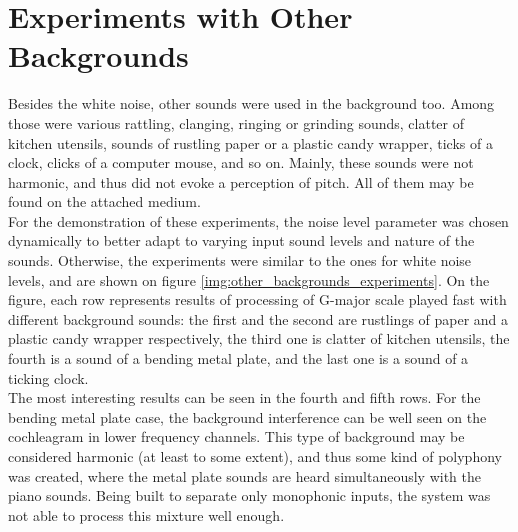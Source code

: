 \section{Experiments with Other Backgrounds}

Besides the white noise, other sounds were used in the background too. Among those were various rattling, clanging, ringing or grinding sounds, clatter of kitchen utensils, sounds of rustling paper or a plastic candy wrapper, ticks of a clock, clicks of a computer mouse, and so on. Mainly, these sounds were not harmonic, and thus did not evoke a perception of pitch. All of them may be found on the attached medium.\\

For the demonstration of these experiments, the noise level parameter was chosen dynami\-cally to better adapt to varying input sound levels and nature of the sounds. Otherwise, the experiments were similar to the ones for white noise levels, and are shown on figure \ref{img:other_backgrounds_experiments}. On the figure, each row represents results of processing of G-major scale played fast with different background sounds: the first and the second are rustlings of paper and a plastic candy wrapper respectively, the third one is clatter of kitchen utensils, the fourth is a sound of a bending metal plate, and the last one is a sound of a ticking clock.\\

The most interesting results can be seen in the fourth and fifth rows. For the bending metal plate case, the background interference can be well seen on the cochleagram in lower frequency channels. This type of background may be considered harmonic (at least to some extent), and thus some kind of polyphony was created, where the metal plate sounds are heard simultaneously with the piano sounds. Being built to separate only monophonic inputs, the system was not able to process this mixture well enough.\\

